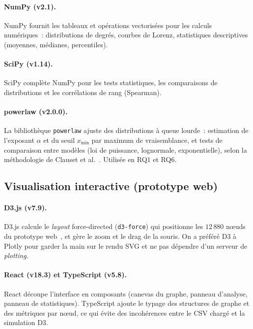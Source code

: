 \paragraph{NumPy (v2.1).}
NumPy fournit les tableaux et op\'erations vectoris\'ees pour les calculs
num\'eriques~: distributions de degr\'es, courbes de Lorenz, statistiques
descriptives (moyennes, m\'edianes, percentiles).

\paragraph{SciPy (v1.14).}
SciPy compl\`ete NumPy pour les tests statistiques, les comparaisons de
distributions et les corr\'elations de rang (Spearman).

\paragraph{powerlaw (v2.0.0).}
La biblioth\`eque \texttt{powerlaw} ajuste des distributions \`a queue
lourde~: estimation de l'exposant $\alpha$ et du seuil $x_{\min}$ par
maximum de vraisemblance, et tests de comparaison entre mod\`eles (loi de
puissance, lognormale, exponentielle), selon la m\'ethodologie de Clauset
et al.~\cite{clauset2009powerlaw}. Utilis\'ee en RQ1 et RQ6.

\subsection{Visualisation interactive (prototype web)}

\paragraph{D3.js (v7.9).}
D3.js calcule le \textit{layout} force-directed (\texttt{d3-force}) qui
positionne les $12\,880$ n\oe{}uds du prototype web~\cite{cryptographexplorer_web},
et g\`ere le zoom et le drag de la souris. On a pr\'ef\'er\'e D3 \`a Plotly
pour garder la main sur le rendu SVG et ne pas d\'ependre d'un serveur de
\textit{plotting}.

\paragraph{React (v18.3) et TypeScript (v5.8).}
React d\'ecoupe l'interface en composants (canevas du graphe, panneau
d'analyse, panneau de statistiques). TypeScript ajoute le typage des
structures de graphe et des m\'etriques par n\oe{}ud, ce qui \'evite des
incoh\'erences entre le CSV charg\'e et la simulation D3.

